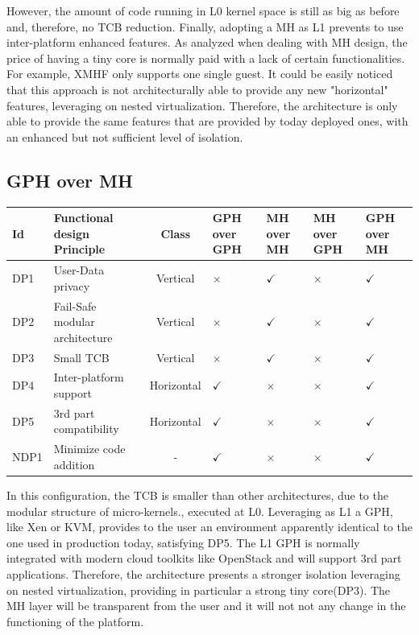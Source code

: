 \documentclass{acm_proc_article-sp} %
\begin{document}
However, the amount of code running in L0 kernel space is still as big as before and, therefore, no TCB reduction. 
Finally, adopting a MH as L1 prevents to use inter-platform enhanced features. As analyzed when dealing with MH design, the price of having a tiny core is normally paid with a lack of certain functionalities. For example, XMHF only supports one single guest. It could be easily noticed that this approach is not architecturally able to provide any new "horizontal" features, leveraging on nested virtualization. Therefore, the architecture is only able to provide the same features that are provided by today deployed ones, with an enhanced but not sufficient level of isolation.

\subsection{GPH over MH}
\label{par:gom}

\begin{table}
\label{fin:conf}
\centering
\begin{tabular}{llcllll}
\toprule
Id & Functional design Principle & Class & GPH over GPH & MH over MH & MH over GPH & GPH over MH\\
\midrule
DP1 & User-Data privacy & Vertical & $\times$  & $\checkmark$ & $\times $ & $\checkmark$ \\
      DP2 & Fail-Safe modular architecture & Vertical & $\times$  & $\checkmark$ & $\times$ & $\checkmark$ \\
   DP3 & Small TCB & Vertical &  $\times$& $\checkmark$ & $\times$ & $\checkmark$ \\
   DP4 & Inter-platform support & Horizontal & $\checkmark$  & $\times$ & $\times$ & $\checkmark$ \\
   DP5 & 3rd part compatibility & Horizontal & $\checkmark$  & $\times$ & $\times$ & $\checkmark$ \\
   NDP1 & Minimize code addition & - & $\checkmark$  & $\times$ & $\times$ & $\checkmark$ \\
\bottomrule
      \end{tabular}
\end{table}

In this configuration, the TCB is smaller than other architectures, due to the modular structure of micro-kernels., executed at L0. Leveraging as L1 a GPH, like Xen or KVM, provides to the user an environment apparently  identical to the one used in production today, satisfying DP5. The L1 GPH is normally integrated with modern cloud toolkits like OpenStack and will support 3rd part applications.
Therefore, the architecture presents a stronger isolation leveraging on nested virtualization, providing in particular a strong tiny core(DP3). The MH layer will be transparent from the user and it will not not any change in the functioning of the platform.
\end{document}
